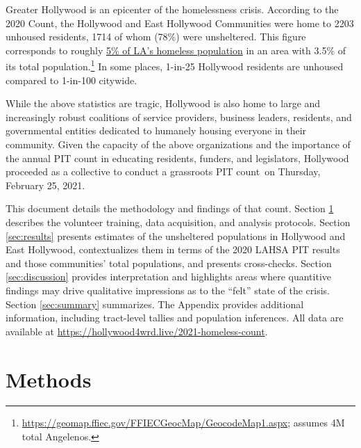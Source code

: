 \documentclass[11pt,twocolumn]{article}
\def\Count{count}
\begin{document}
Greater Hollywood is an epicenter of the homelessness crisis. According to the 2020 Count, the 
Hollywood and East Hollywood Communities were home to 2203 unhoused residents, 1714 of whom 
(78\%) were unsheltered. This figure corresponds to roughly 
\href{https://www.lahsa.org/data?id=45-2020-homeless-count-by-community-city}
{5\% of LA's homeless population} in an area with 3.5\% of its total population.\footnote{
\url{https://geomap.ffiec.gov/FFIECGeocMap/GeocodeMap1.aspx}; assumes 4M total Angelenos.} 
In some places, 1-in-25 Hollywood residents are unhoused compared to 1-in-100 citywide.

While the above statistics are tragic, Hollywood is also home to large and increasingly robust
coalitions of service providers, business leaders, residents, and governmental entities dedicated to 
humanely housing everyone in their community. Given the capacity of the above organizations and 
the importance of the annual PIT count in educating residents, funders, and legislators, Hollywood 
proceeded as a collective to conduct a grassroots PIT \Count\ on Thursday, February 25, 2021.

This document details the methodology and findings of that \Count. 
Section \ref{sec:procedure} describes the volunteer training, data acquisition, 
and analysis protocols. Section \ref{sec:results} presents estimates of the unsheltered 
populations in Hollywood and East Hollywood, contextualizes them in terms of the 2020 
LAHSA PIT results and those communities' total populations, and presents cross-checks. 
Section \ref{sec:discussion} provides interpretation and highlights areas where quantitive findings 
may drive qualitative impressions as to the ``felt'' state of the crisis. Section \ref{sec:summary} 
summarizes. The Appendix provides additional information, including tract-level tallies and 
population inferences. All data are available at \url{https://hollywood4wrd.live/2021-homeless-count}.

\section{Methods}
\label{sec:procedure}
%
%
\end{document}
